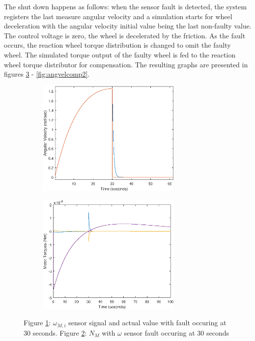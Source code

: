 The shut down happens as follows: when the sensor fault is detected, the system registers the last measure angular velocity and a simulation starts for wheel deceleration with the angular velocity initial value being the last non-faulty value. The control voltage is zero, the wheel is decelerated by the friction. As the fault occurs, the reaction wheel torque distribution is changed to omit the faulty wheel. The simulated torque output of the faulty wheel is fed to the reaction wheel torque distributor for compensation. The resulting graphs are presented in figures \ref{fig:angvelcomp1} - \ref{fig:angvelcomp2}.


\begin{figure}
	\centering
	\begin{subfigure}{.5\textwidth}
	\centering
	\includegraphics[width=70mm]{figures/omegaSensorfault_omega}
	\caption{}
	\label{fig:sub1}
	\end{subfigure}%
	\begin{subfigure}{.5\textwidth}
	\centering
	\includegraphics[width=70mm]{figures/omegaSensorfault_Nmotor}
	\caption{}
	\label{fig:sub2}
	\end{subfigure}
	\caption{Figure \ref{fig:sub1}: $\omega_{M,i}$ sensor signal and actual value with fault occuring at 30 seconds. Figure \ref{fig:sub2}: $N_M$ with $\omega$ sensor fault occuring at 30 seconds}
	\label{fig:angvelcomp1}
\end{figure}

